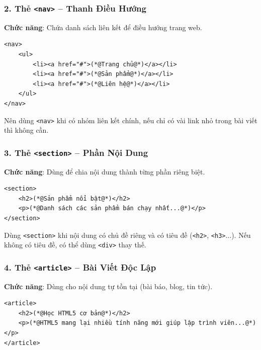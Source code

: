 \documentclass[11pt,oneside]{book}
\newcommand{\codeinline}[1]{\textcolor{accentOrange}{\texttt{#1}}}
\begin{document}
\subsubsection{2. Thẻ \codeinline{<nav>} -- Thanh Điều Hướng}
\textbf{Chức năng}: Chứa danh sách liên kết để điều hướng trang web.

\begin{codeWindow}
\begin{lstlisting}[language=HTML5]
<nav>
    <ul>
        <li><a href="#">(*@Trang chủ@*)</a></li>
        <li><a href="#">(*@Sản phẩm@*)</a></li>
        <li><a href="#">(*@Liên hệ@*)</a></li>
    </ul>
</nav>
\end{lstlisting}
\end{codeWindow}

\begin{noteBox}
Nên dùng \codeinline{<nav>} khi có nhóm liên kết chính, nếu chỉ có vài link nhỏ trong bài viết thì không cần.
\end{noteBox}

\subsubsection{3. Thẻ \codeinline{<section>} -- Phần Nội Dung}
\textbf{Chức năng}: Dùng để chia nội dung thành từng phần riêng biệt.

\begin{codeWindow}
\begin{lstlisting}[language=HTML5]
<section>
    <h2>(*@Sản phẩm nổi bật@*)</h2>
    <p>(*@Danh sách các sản phẩm bán chạy nhất...@*)</p>
</section>
\end{lstlisting}
\end{codeWindow}

\begin{noteBox}
Dùng \codeinline{<section>} khi nội dung có chủ đề riêng và có tiêu đề (\codeinline{<h2>}, \codeinline{<h3>}...). Nếu không có tiêu đề, có thể dùng \codeinline{<div>} thay thế.
\end{noteBox}

\subsubsection{4. Thẻ \codeinline{<article>} -- Bài Viết Độc Lập}
\textbf{Chức năng}: Dùng cho nội dung tự tồn tại (bài báo, blog, tin tức).

\begin{codeWindow}
\begin{lstlisting}[language=HTML5]
<article>
    <h2>(*@Học HTML5 cơ bản@*)</h2>
    <p>(*@HTML5 mang lại nhiều tính năng mới giúp lập trình viên...@*)</p>
</article>
\end{lstlisting}
\end{codeWindow}
\end{document}
